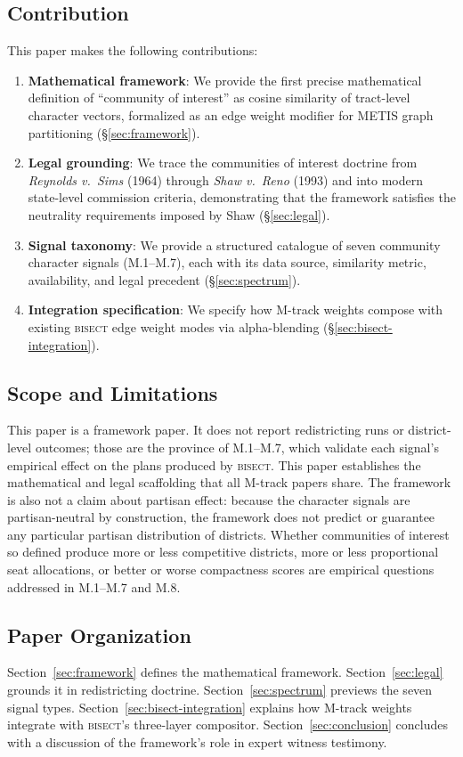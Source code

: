 \subsection{Contribution}

This paper makes the following contributions:
\begin{enumerate}
  \item \textbf{Mathematical framework}: We provide the first precise mathematical
    definition of ``community of interest'' as cosine similarity of tract-level
    character vectors, formalized as an edge weight modifier for METIS graph
    partitioning (\S\ref{sec:framework}).
  \item \textbf{Legal grounding}: We trace the communities of interest doctrine from
    \textit{Reynolds v.\ Sims} (1964) through \textit{Shaw v.\ Reno} (1993)
    and into modern state-level commission criteria, demonstrating that the framework
    satisfies the neutrality requirements imposed by Shaw (\S\ref{sec:legal}).
  \item \textbf{Signal taxonomy}: We provide a structured catalogue of seven
    community character signals (M.1--M.7), each with its data source, similarity
    metric, availability, and legal precedent (\S\ref{sec:spectrum}).
  \item \textbf{Integration specification}: We specify how M-track weights compose
    with existing \textsc{bisect} edge weight modes via alpha-blending
    (\S\ref{sec:bisect-integration}).
\end{enumerate}

\subsection{Scope and Limitations}

This paper is a framework paper.
It does not report redistricting runs or district-level outcomes; those are the province
of M.1--M.7, which validate each signal's empirical effect on the plans produced by
\textsc{bisect}.
This paper establishes the mathematical and legal scaffolding that all M-track papers
share.
The framework is also not a claim about partisan effect: because the character signals
are partisan-neutral by construction, the framework does not predict or guarantee any
particular partisan distribution of districts.
Whether communities of interest so defined produce more or less competitive districts,
more or less proportional seat allocations, or better or worse compactness scores
are empirical questions addressed in M.1--M.7 and M.8.

\subsection{Paper Organization}

Section~\ref{sec:framework} defines the mathematical framework.
Section~\ref{sec:legal} grounds it in redistricting doctrine.
Section~\ref{sec:spectrum} previews the seven signal types.
Section~\ref{sec:bisect-integration} explains how M-track weights integrate with
\textsc{bisect}'s three-layer compositor.
Section~\ref{sec:conclusion} concludes with a discussion of the framework's
role in expert witness testimony.
